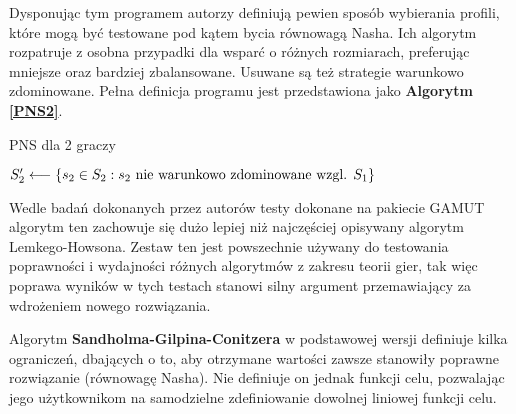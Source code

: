 \documentclass[polish]{standalone}
\begin{document}
Dysponując tym programem autorzy definiują pewien sposób wybierania profili, które mogą być testowane pod kątem bycia
równowagą Nasha. Ich algorytm rozpatruje z osobna przypadki dla wsparć o różnych rozmiarach, preferując mniejsze oraz
bardziej zbalansowane. Usuwane są też strategie warunkowo zdominowane. Pełna definicja programu jest przedstawiona jako
\textbf{Algorytm \ref{PNS2}}.

\begin{algorithm}
\caption{PNS dla 2 graczy}
\label{PNS2}
\begin{algorithmic}
  \STATE $S_2' \longleftarrow \{ s_2 \in S_2: s_2 \textrm{ nie warunkowo zdominowane wzgl. } S_1 \}$
      \ENDIF
    \ENDIF
   \ENDFOR
  \ENDIF
 \ENDFOR
\ENDFOR
\end{algorithmic}
\end{algorithm}

Wedle badań dokonanych przez autorów testy dokonane na pakiecie GAMUT algorytm ten zachowuje się dużo lepiej niż
najczęściej opisywany algorytm Lemkego-Howsona. Zestaw ten jest powszechnie używany do testowania poprawności
i wydajności różnych algorytmów z zakresu teorii gier, tak więc poprawa wyników w tych testach stanowi silny argument
przemawiający za wdrożeniem nowego rozwiązania.\cite{GAMUT}


Algorytm \textbf{Sandholma-Gilpina-Conitzera} w podstawowej wersji definiuje kilka ograniczeń, dbających o to, aby 
otrzymane wartości zawsze stanowiły poprawne rozwiązanie (równowagę Nasha). Nie definiuje on jednak funkcji celu,
pozwalając jego użytkownikom na samodzielne zdefiniowanie dowolnej liniowej funkcji celu.
\end{document}
